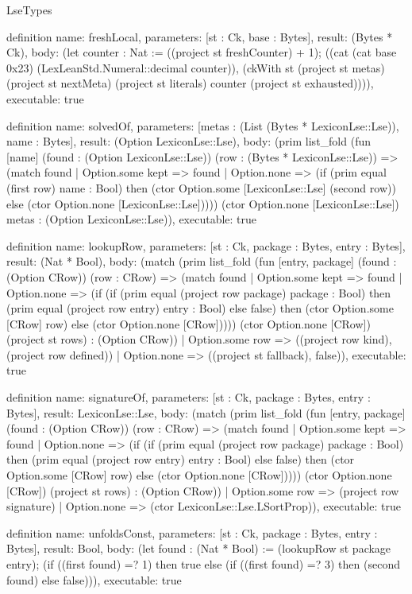 \begin{lexlean}{LseTypes}
\begin{semanticmodule}
definition{
  name: freshLocal,
  parameters: [st : Ck, base : Bytes],
  result: (Bytes * Ck),
  body: (let counter : Nat := ((project st freshCounter) + 1); ((cat (cat base 0x23) (LexLeanStd.Numeral::decimal counter)), (ckWith st (project st metas) (project st nextMeta) (project st literals) counter (project st exhausted)))),
  executable: true
}

definition{
  name: solvedOf,
  parameters: [metas : (List (Bytes * LexiconLse::Lse)), name : Bytes],
  result: (Option LexiconLse::Lse),
  body: (prim list_fold (fun [name] (found : (Option LexiconLse::Lse)) (row : (Bytes * LexiconLse::Lse)) => (match found
    | Option.some kept => found
    | Option.none => (if (prim equal (first row) name : Bool) then (ctor Option.some [LexiconLse::Lse] (second row)) else (ctor Option.none [LexiconLse::Lse])))) (ctor Option.none [LexiconLse::Lse]) metas : (Option LexiconLse::Lse)),
  executable: true
}

definition{
  name: lookupRow,
  parameters: [st : Ck, package : Bytes, entry : Bytes],
  result: (Nat * Bool),
  body: (match (prim list_fold (fun [entry, package] (found : (Option CRow)) (row : CRow) => (match found
      | Option.some kept => found
      | Option.none => (if (if (prim equal (project row package) package : Bool) then (prim equal (project row entry) entry : Bool) else false) then (ctor Option.some [CRow] row) else (ctor Option.none [CRow])))) (ctor Option.none [CRow]) (project st rows) : (Option CRow))
    | Option.some row => ((project row kind), (project row defined))
    | Option.none => ((project st fallback), false)),
  executable: true
}

definition{
  name: signatureOf,
  parameters: [st : Ck, package : Bytes, entry : Bytes],
  result: LexiconLse::Lse,
  body: (match (prim list_fold (fun [entry, package] (found : (Option CRow)) (row : CRow) => (match found
      | Option.some kept => found
      | Option.none => (if (if (prim equal (project row package) package : Bool) then (prim equal (project row entry) entry : Bool) else false) then (ctor Option.some [CRow] row) else (ctor Option.none [CRow])))) (ctor Option.none [CRow]) (project st rows) : (Option CRow))
    | Option.some row => (project row signature)
    | Option.none => (ctor LexiconLse::Lse.LSortProp)),
  executable: true
}

definition{
  name: unfoldsConst,
  parameters: [st : Ck, package : Bytes, entry : Bytes],
  result: Bool,
  body: (let found : (Nat * Bool) := (lookupRow st package entry); (if ((first found) =? 1) then true else (if ((first found) =? 3) then (second found) else false))),
  executable: true
}


\end{semanticmodule}
\end{lexlean}
